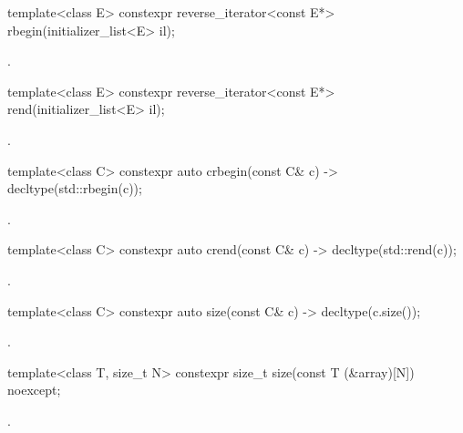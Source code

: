 %
\begin{itemdecl}
template<class E> constexpr reverse_iterator<const E*> rbegin(initializer_list<E> il);
\end{itemdecl}
\begin{itemdescr}
\pnum
\returns
{}.
\end{itemdescr}

%
\begin{itemdecl}
template<class E> constexpr reverse_iterator<const E*> rend(initializer_list<E> il);
\end{itemdecl}
\begin{itemdescr}
\pnum
\returns
{}.
\end{itemdescr}

%
\begin{itemdecl}
template<class C> constexpr auto crbegin(const C& c) -> decltype(std::rbegin(c));
\end{itemdecl}
\begin{itemdescr}
\pnum
\returns
{}.
\end{itemdescr}

%
\begin{itemdecl}
template<class C> constexpr auto crend(const C& c) -> decltype(std::rend(c));
\end{itemdecl}
\begin{itemdescr}
\pnum
\returns
{}.
\end{itemdescr}

%
\begin{itemdecl}
template<class C> constexpr auto size(const C& c) -> decltype(c.size());
\end{itemdecl}
\begin{itemdescr}
\pnum
\returns
{}.
\end{itemdescr}

%
\begin{itemdecl}
template<class T, size_t N> constexpr size_t size(const T (&array)[N]) noexcept;
\end{itemdecl}
\begin{itemdescr}
\pnum
\returns
{}.
\end{itemdescr}

